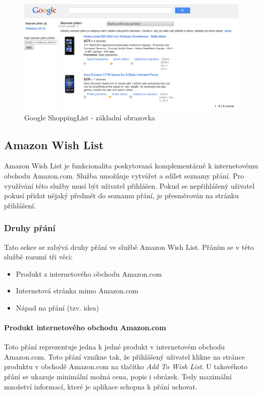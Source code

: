 \begin{figure}[htb]
\begin{center}
\includegraphics[width=120mm]{./pictures/google-shopping-list.png}
\caption{Google ShoppingList - základní obrazovka}
\label{fig:google-shoppinglist}
\end{center}
\end{figure}

\subsection{Amazon Wish List}
Amazon Wish List je funkcionalita poskytovaná komplementárně k internetovému obchodu Amazon.com. Služba umožňuje vytvářet a sdílet seznamy přání. Pro využívání této služby musí být uživatel přihlášen. Pokud se nepřihlášený uživatel pokusí přidat nějaký předmět do seznamu přání, je přesměrován na stránku přihlášení.

\subsubsection{Druhy přání}
Tato sekce se zabývá druhy přání ve službě Amazon Wish List. Přáním se v této službě rozumí tři věci:
\begin{itemize}
\item Produkt z internetového obchodu Amazon.com
\item Internetová stránka mimo Amazon.com
\item Nápad na přání (tzv. idea)
\end{itemize}

\paragraph{Produkt internetového obchodu Amazon.com}
\label{par:produkt-amazon}
Toto přání reprezentuje jedna k jedné produkt v internetovém obchodu Amazon.com. Toto přání vznikne tak, že přihlášený uživatel klikne na stránce produktu v obchodě Amazon.com na tlačítko \emph{Add To Wish List}. U takovéhoto přání se ukazuje minimální možná cena, popis i obrázek. Tedy maximální množství informací, které je aplikace schopna k přání uchovat.

